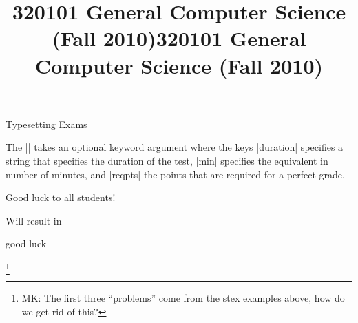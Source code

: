 \begin{sfragment}{Typesetting Exams}

The |\testheading| takes an optional keyword argument
where the keys |duration| specifies a string that specifies the
duration of the test, |min| specifies the equivalent in number of
minutes, and |reqpts| the points that are required for a perfect
grade.

\begin{stexcode}
\title{320101 General Computer Science (Fall 2010)}
\begin{testheading}[duration=one hour,min=60,reqpts=27]
  Good luck to all students!
\end{testheading}
\end{stexcode}

Will result in
\begin{center}
  \begin{minipage}{.9\textwidth}
\makeatletter
\makeatother
\title{320101 General Computer Science (Fall 2010)}
\begin{testheading}[duration=one hour,min=60,reqpts=27]
  good luck
\end{testheading}
\end{minipage}
\end{center}
\footnote{MK: The first three ``problems'' come from the stex examples above, how do we get rid
  of this?}
\end{sfragment}


